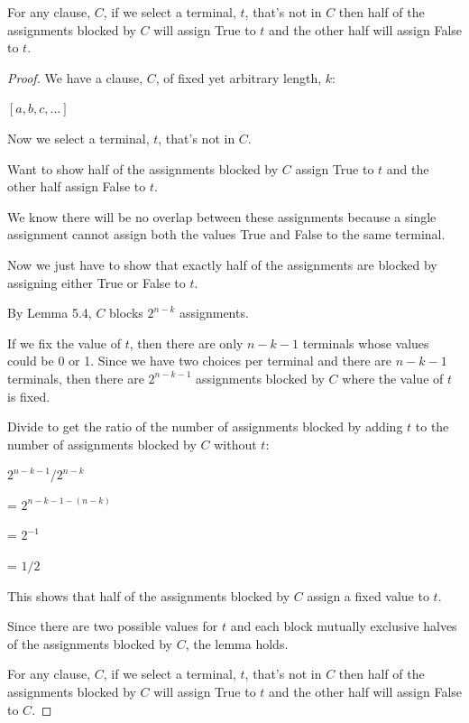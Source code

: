 \documentclass[manuscript]{acmart}
\begin{document}
    \begin{lemma}
        For any clause, $C$, if we select a terminal, $t$, that's not in $C$ then half of the assignments blocked by $C$ will assign True to $t$ and the other half will assign 
        False to $t$.
    \end{lemma}
    \begin{proof}
        We have a clause, $C$, of fixed yet arbitrary length, $k$:

        $[a, b, c, ...]$

        Now we select a terminal, $t$, that's not in $C$.

        Want to show half of the assignments blocked by $C$ assign True to $t$ and the other half assign False to $t$.

        We know there will be no overlap between these assignments because a single assignment cannot assign both the values True and False to the same terminal.

        Now we just have to show that exactly half of the assignments are blocked by assigning either True or False to $t$.

        By Lemma 5.4, $C$ blocks $2^{n-k}$ assignments. 

        If we fix the value of $t$, then there are only $n-k-1$ terminals whose values could be 0 or 1. Since we have two choices per terminal and there are $n-k-1$ terminals, then there are $2^{n-k-1}$ assignments blocked by $C$ where the value of $t$ is fixed.

        Divide to get the ratio of the number of assignments blocked by adding $t$ to the number of assignments blocked by $C$ without $t$:
        
        $2^{n-k-1}/2^{n-k}$

        = $2^{n - k - 1 - (n - k)}$

        = $2^{-1}$

        = $1/2$

        This shows that half of the assignments blocked by $C$ assign a fixed value to $t$.

        Since there are two possible values for $t$ and each block mutually exclusive halves of the assignments blocked by $C$, the lemma holds.

        For any clause, $C$, if we select a terminal, $t$, that's not in $C$ then half of the assignments blocked by $C$ will assign True to $t$ and the other half will assign False to $C$.
    \end{proof}
\end{document}
